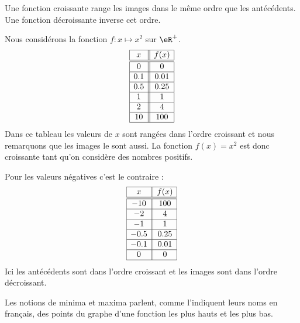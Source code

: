 Une fonction croissante range les images dans le même ordre que les antécédents. Une fonction décroissante inverse cet ordre. 

\begin{example}
    Nous considérons la fonction \( f\colon x\mapsto x^2\) sur \( \eR^+\).
    \begin{equation*}
        \begin{array}[]{|c||c|}
            \hline
            x&f(x)\\
            \hline\hline
            0&0\\
            \hline
            0.1&0.01\\
            \hline
            0.5&0.25\\
            \hline
            1&1\\
            \hline
            2&4\\
            \hline
            10&100\\
            \hline
        \end{array}
    \end{equation*}
    Dans ce tableau les valeurs de \( x\) sont rangées dans l'ordre croissant et nous remarquons que les images le sont aussi. La fonction \( f(x)=x^2\) est donc croissante tant qu'on considère des nombres positifs.

    Pour les valeurs négatives c'est le contraire :
    \begin{equation*}
        \begin{array}[]{|c||c|}
            \hline
            x&f(x)\\
            \hline\hline
            -10&100\\
            \hline
            -2&4\\
            \hline
            -1&1\\
            \hline
            -0.5&0.25\\
            \hline
            -0.1&0.01\\
            \hline
            0&0\\
            \hline
        \end{array}
    \end{equation*}
    Ici les antécédents sont dans l'ordre croissant et les images sont dans l'ordre décroissant.
\end{example}
  


Les notions de minima et maxima parlent, comme l'indiquent leurs noms en français, des points du graphe d'une fonction les plus hauts et les plus bas.

